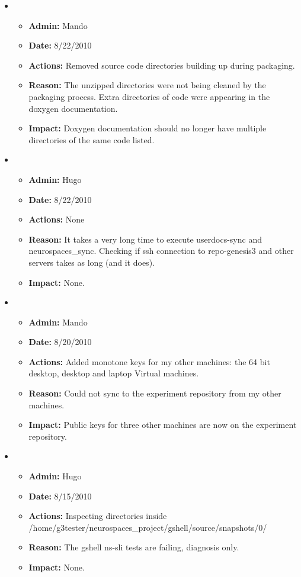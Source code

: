 \documentclass[12pt]{article}
\begin{document}
\begin{itemize}
\item 
\begin{itemize}
\item[] {\bf Admin:} Mando
\item[] {\bf Date:} 8/22/2010 
\item[] {\bf Actions:} Removed source code directories building up during packaging.
\item[] {\bf Reason:} The unzipped directories were not being cleaned by the packaging process. Extra directories of code were appearing in the doxygen documentation.
\item[] {\bf Impact:} Doxygen documentation should no longer have multiple directories of the same code listed.
\end{itemize}

\item 
\begin{itemize}
\item[] {\bf Admin:} Hugo
\item[] {\bf Date:} 8/22/2010 
\item[] {\bf Actions:} None
\item[] {\bf Reason:} It takes a very long time to execute
  userdocs-sync and neurospaces\_sync.  Checking if ssh connection to
  repo-genesis3 and other servers takes as long (and it does).
\item[] {\bf Impact:} None.
\end{itemize}

\item 
\begin{itemize}
\item[] {\bf Admin:} Mando
\item[] {\bf Date:} 8/20/2010 
\item[] {\bf Actions:} Added monotone keys for my other machines: the 64 bit desktop, desktop and laptop Virtual machines.
\item[] {\bf Reason:} Could not sync to the experiment repository from my other machines.
\item[] {\bf Impact:} Public keys for three other machines are now on the experiment repository.
\end{itemize}
	
\item 
\begin{itemize}
\item[] {\bf Admin:} Hugo
\item[] {\bf Date:} 8/15/2010 
\item[] {\bf Actions:} Inspecting directories inside
  /home/g3tester/neurospaces\_project/gshell/source/snapshots/0/
\item[] {\bf Reason:} The gshell ns-sli tests are failing, diagnosis
  only.
\item[] {\bf Impact:} None.
\end{itemize}


\end{itemize}
\end{document}
